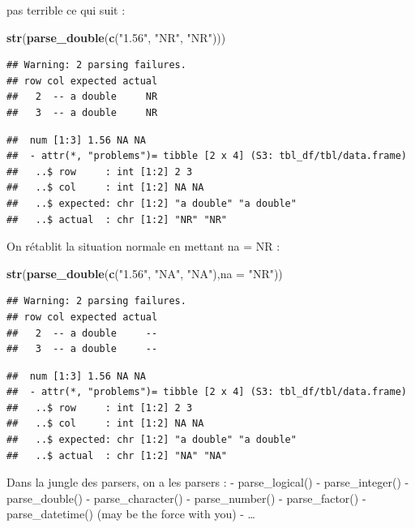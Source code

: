 \documentclass[
]{book}
\newenvironment{Shaded}{\begin{snugshade}}{\end{snugshade}}
\newcommand{\AttributeTok}[1]{\textcolor[rgb]{0.13,0.29,0.53}{#1}}
\newcommand{\FunctionTok}[1]{\textcolor[rgb]{0.13,0.29,0.53}{\textbf{#1}}}
\newcommand{\NormalTok}[1]{#1}
\newcommand{\StringTok}[1]{\textcolor[rgb]{0.31,0.60,0.02}{#1}}
\begin{document}
pas terrible ce qui suit :

\begin{Shaded}
\begin{Highlighting}[]
\FunctionTok{str}\NormalTok{(}\FunctionTok{parse\_double}\NormalTok{(}\FunctionTok{c}\NormalTok{(}\StringTok{"1.56"}\NormalTok{, }\StringTok{"NR"}\NormalTok{, }\StringTok{"NR"}\NormalTok{)))}
\end{Highlighting}
\end{Shaded}

\begin{verbatim}
## Warning: 2 parsing failures.
## row col expected actual
##   2  -- a double     NR
##   3  -- a double     NR
\end{verbatim}

\begin{verbatim}
##  num [1:3] 1.56 NA NA
##  - attr(*, "problems")= tibble [2 x 4] (S3: tbl_df/tbl/data.frame)
##   ..$ row     : int [1:2] 2 3
##   ..$ col     : int [1:2] NA NA
##   ..$ expected: chr [1:2] "a double" "a double"
##   ..$ actual  : chr [1:2] "NR" "NR"
\end{verbatim}

On rétablit la situation normale en mettant na = NR :

\begin{Shaded}
\begin{Highlighting}[]
\FunctionTok{str}\NormalTok{(}\FunctionTok{parse\_double}\NormalTok{(}\FunctionTok{c}\NormalTok{(}\StringTok{"1.56"}\NormalTok{, }\StringTok{"NA"}\NormalTok{, }\StringTok{"NA"}\NormalTok{),}\AttributeTok{na =} \StringTok{"NR"}\NormalTok{))}
\end{Highlighting}
\end{Shaded}

\begin{verbatim}
## Warning: 2 parsing failures.
## row col expected actual
##   2  -- a double     --
##   3  -- a double     --
\end{verbatim}

\begin{verbatim}
##  num [1:3] 1.56 NA NA
##  - attr(*, "problems")= tibble [2 x 4] (S3: tbl_df/tbl/data.frame)
##   ..$ row     : int [1:2] 2 3
##   ..$ col     : int [1:2] NA NA
##   ..$ expected: chr [1:2] "a double" "a double"
##   ..$ actual  : chr [1:2] "NA" "NA"
\end{verbatim}

Dans la jungle des parsers, on a les parsers :
- parse\_logical()
- parse\_integer()
- parse\_double()
- parse\_character()
- parse\_number()
- parse\_factor()
- parse\_datetime() (may be the force with you)
- \ldots{}
\end{document}
